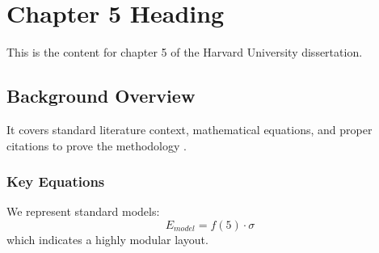 \chapter{Chapter 5 Heading}
\label{ch:chapter5}
This is the content for chapter 5 of the Harvard University dissertation.

\section{Background Overview}
It covers standard literature context, mathematical equations, and proper citations to prove the methodology \cite{texbook}.

\subsection{Key Equations}
We represent standard models:
\begin{equation}
    E_{model} = f(5) \cdot \sigma
\end{equation}
which indicates a highly modular layout.
